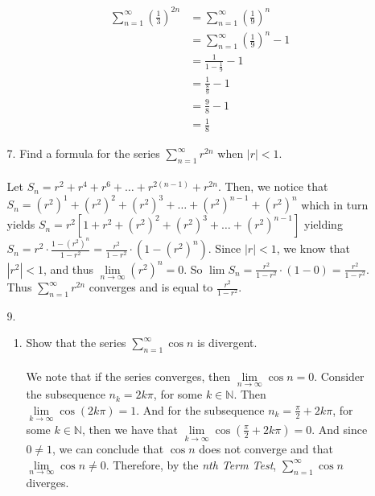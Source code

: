 \documentclass[12pt,letterpaper]{article}
\newcommand{\limx}[2]{\displaystyle\lim\limits_{#1 \to #2}}
\newcommand{\N}{\mathbb{N}}
\theoremstyle{case}
\theoremstyle{definition}
\begin{document}
\begin{enumerate}
\begin{enumerate}
\begin{enumerate}
				 \begin{align*}
				 	\sum_{n=1}^{\infty} \left(\frac{1}{3}\right)^{2n} &= \sum_{n=1}^{\infty} \left(\frac{1}{9}\right)^n \\
				 	&= \sum_{n=1}^{\infty}\left(\frac{1}{9}\right)^n-1 \\
				 	&= \frac{1}{1-\frac{1}{9}}-1 \\
				 	&= \frac{1}{\frac{8}{9}} - 1 \\
				 	&= \frac{9}{8} - 1 \\
				 	&= \frac{1}{8}
				 \end{align*}
			\end{enumerate}
			\item[7.] Find a formula for the series $\displaystyle\sum_{n=1}^{\infty} r^{2n}$ when $|r| < 1$.
			\\\\Let $S_n = r^2+r^4+r^6+\dots+r^{2(n-1)}+r^{2n}$. Then, we notice that $S_n=(r^2)^1+(r^2)^2+(r^2)^3+\dots + (r^2)^{n-1} + (r^2)^n$ which in turn yields $S_n=r^2[1+r^2+(r^2)^2+(r^2)^3+\dots+(r^2)^{n-1}]$ yielding $S_n=r^2 \cdot \frac{1-(r^2)^n}{1-r^2}=\frac{r^2}{1-r^2} \cdot (1-(r^2)^n)$. Since $|r|<1$, we know that $|r^2|<1$, and thus $\limx{n}{\infty} (r^2)^n=0$. So $\lim S_n=\frac{r^2}{1-r^2} \cdot (1-0)=\frac{r^2}{1-r^2}$. Thus $\displaystyle\sum_{n=1}^{\infty} r^{2n}$ converges and is equal to $\frac{r^2}{1-r^2}$.
			\item[9.]
			\begin{enumerate}
				\item Show that the series $\displaystyle\sum_{n=1}^{\infty} \cos n$ is divergent.
				\\\\We note that if the series converges, then $\limx{n}{\infty} \cos n = 0$. Consider the subsequence $n_k=2k\pi$, for some $k \in \N$. Then $\limx{k}{\infty} \cos (2k\pi)=1$. And for the subsequence $n_k=\frac{\pi}{2}+2k\pi$, for some $k \in \N$, then we have that $\limx{k}{\infty} \cos \left(\frac{\pi}{2}+2k\pi\right)=0$. And since $0 \neq 1$, we can conclude that $\cos n$ does not converge and that $\limx{n}{\infty} \cos n \neq 0$. Therefore, by the \textit{nth Term Test}, $\displaystyle\sum_{n=1}^{\infty} \cos n$ diverges.
				 

\end{enumerate}
\end{enumerate}
\end{enumerate}
\end{document}
